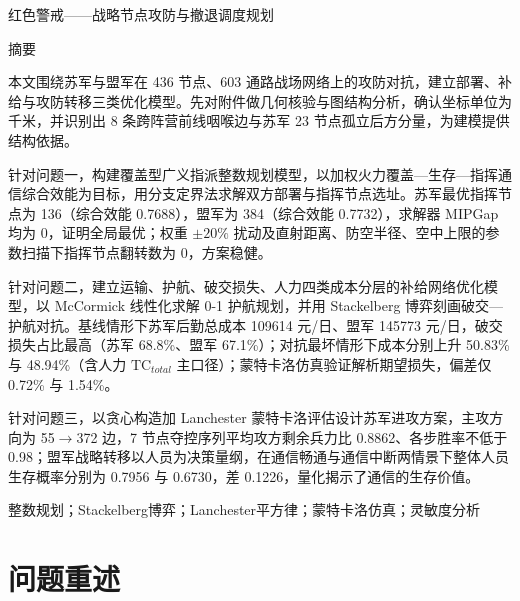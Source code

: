 \documentclass[12pt,a4paper]{ctexart}
\begin{document}
\begin{titlepage}
\centering
{\heiti 红色警戒——战略节点攻防与撤退调度规划\par}
\vspace{0.5cm}
{\heiti 摘\hspace{2em}要\par}
\vspace{0.2cm}

\begin{minipage}{0.95\textwidth}
\setlength{\parindent}{2em}
本文围绕苏军与盟军在 436 节点、603 通路战场网络上的攻防对抗，建立部署、补给与攻防转移三类优化模型。先对附件做几何核验与图结构分析，确认坐标单位为千米，并识别出 8 条跨阵营前线咽喉边与苏军 23 节点孤立后方分量，为建模提供结构依据。

针对问题一，构建覆盖型广义指派整数规划模型，以加权火力覆盖—生存—指挥通信综合效能为目标，用分支定界法求解双方部署与指挥节点选址。苏军最优指挥节点为 136（综合效能 0.7688），盟军为 384（综合效能 0.7732），求解器 MIPGap 均为 0，证明全局最优；权重 $\pm 20\%$ 扰动及直射距离、防空半径、空中上限的参数扫描下指挥节点翻转数为 0，方案稳健。

针对问题二，建立运输、护航、破交损失、人力四类成本分层的补给网络优化模型，以 McCormick 线性化求解 0-1 护航规划，并用 Stackelberg 博弈刻画破交—护航对抗。基线情形下苏军后勤总成本 109614 元/日、盟军 145773 元/日，破交损失占比最高（苏军 68.8\%、盟军 67.1\%）；对抗最坏情形下成本分别上升 50.83\% 与 48.94\%（含人力 $\mathrm{TC}_{total}$ 主口径）；蒙特卡洛仿真验证解析期望损失，偏差仅 0.72\% 与 1.54\%。

针对问题三，以贪心构造加 Lanchester 蒙特卡洛评估设计苏军进攻方案，主攻方向为 55$\to$372 边，7 节点夺控序列平均攻方剩余兵力比 0.8862、各步胜率不低于 0.98；盟军战略转移以人员为决策量纲，在通信畅通与通信中断两情景下整体人员生存概率分别为 0.7956 与 0.6730，差 0.1226，量化揭示了通信的生存价值。

\vspace{0.3cm}
整数规划；Stackelberg博弈；Lanchester平方律；蒙特卡洛仿真；灵敏度分析
\end{minipage}
\end{titlepage}

\section{问题重述}
\end{document}
